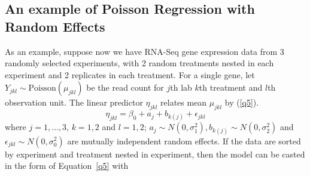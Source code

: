 	\subsection{An example of Poisson Regression with Random Effects}\label{poisson}
	As an example, suppose now we have RNA-Seq gene expression data from 3 randomly selected experiments, with 2 random treatments nested in each experiment and 2 replicates in each treatment. For a single gene, let $Y_{jkl}\sim \text{Poisson}(\mu_{jkl})$ be the read count for $j$th lab $k$th treatment and $l$th observation unit. The linear predictor $\eta_{jkl}$ relates mean $\mu_{jkl}$ by (\ref{q5}).  
	\begin{equation}\label{q6}
	\eta_{jkl} = \beta_0 + a_{j} + b_{k(j)} + \epsilon_{jkl}
	\end{equation}
	where $j=1, \ldots,  3$, $k=1, 2$ and $l=1, 2$; $a_j \sim N(0, \sigma_1^2), b_{k(j)}\sim N(0, \sigma_2^2)$ and $\epsilon_{jkl}\sim N(0, \sigma_0^2)$ are mutually independent random effects. If the data are sorted by experiment and treatment nested in experiment, then the model can be casted in the form of Equation~\ref{q5} with

